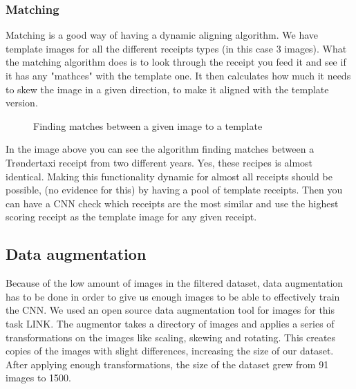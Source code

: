 \subsubsection[aligning]{Matching}

Matching is a good way of having a dynamic aligning algorithm.
We have template images for all the different receipts types (in this case 3 images).
What the matching algorithm does is to look through the receipt you feed it and see if it has any "mathces" with the template one.
It then calculates how much it needs to skew the image in a given direction, to make it aligned with the template version.

\begin{figure}[h]
    \caption{Finding matches between a given image to a template}
    \label{fig:figure4.2}
\end{figure}

In the image above you can see the algorithm finding matches between a Trøndertaxi receipt from two different years.
Yes, these recipes is almost identical.
Making this functionality dynamic for almost all receipts should be possible, (no evidence for this) by having a pool of template receipts.
Then you can have a CNN check which receipts are the most similar and use the highest scoring receipt as the template image for any given receipt.

\subsection{Data augmentation}\label{data augmentation}
Because of the low amount of images in the filtered dataset, data augmentation has to be done in order to give us enough images to be able to effectively train the CNN.
We used an open source data augmentation tool for images for this task LINK.
The augmentor takes a directory of images and applies a series of transformations on the images like scaling, skewing and rotating.
This creates copies of the images with slight differences, increasing the size of our dataset.
After applying enough transformations, the size of the dataset grew from 91 images to 1500.

